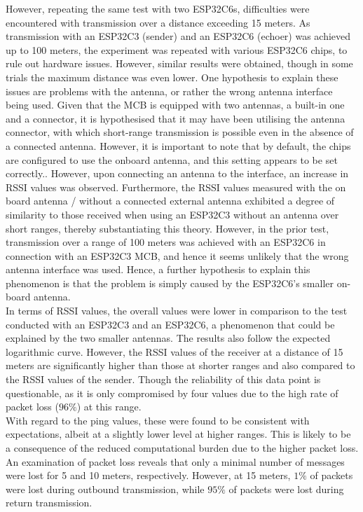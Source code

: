 However, repeating the same test with two ESP32C6s, difficulties were encountered with transmission over a distance exceeding 15 meters. As transmission with an ESP32C3 (sender) and an ESP32C6 (echoer) was achieved up to 100 meters, the experiment was repeated with various ESP32C6 chips, to rule out hardware issues. However, similar results were obtained, though in some trials the maximum distance was even lower. One hypothesis to explain these issues are problems with the antenna, or rather the wrong antenna interface being used. 
Given that the MCB is equipped with two antennas, a built-in one and a connector, it is hypothesised that it may have been utilising the antenna connector, with which short-range transmission is possible even in the absence of a connected antenna. However, it is important to note that by default, the chips are configured to use the onboard antenna, and this setting appears to be set correctly.. However, upon connecting an antenna to the interface, an increase in RSSI values was observed. Furthermore, the RSSI values measured with the on board antenna / without a connected external antenna exhibited a degree of similarity to those received when using an ESP32C3 without an antenna over short ranges, thereby substantiating this theory. However, in the prior test, transmission over a range of 100 meters was achieved with an ESP32C6 in connection with an ESP32C3 MCB, and hence it seems unlikely that the wrong antenna interface was used. Hence, a further hypothesis to explain this phenomenon is that the problem is simply caused by the ESP32C6's smaller on-board antenna. \\

In terms of RSSI values, the overall values were lower in comparison to the test conducted with an ESP32C3 and an ESP32C6, a phenomenon that could be explained by the two smaller antennas. The results also follow the expected logarithmic curve. However, the RSSI values of the receiver at a distance of 15 meters are significantly higher than those at shorter ranges and also compared to the RSSI values of the sender. Though the reliability of this data point is questionable, as it is only compromised by four values due to the high rate of packet loss ($96\%$) at this range. \\

With regard to the ping values, these were found to be consistent with expectations, albeit at a slightly lower level at higher ranges. This is likely to be a consequence of the reduced computational burden due to the higher packet loss. An examination of packet loss reveals that only a minimal number of messages were lost for 5 and 10 meters, respectively. However, at 15 meters, $1\%$ of packets were lost during outbound transmission, while $95\%$ of packets were lost during return transmission.
\newpage

